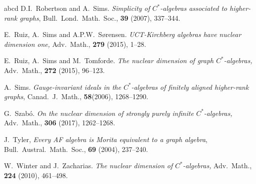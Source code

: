 \documentclass[12pt]{amsart}
\theoremstyle{plain}
\theoremstyle{definition}
\theoremstyle{remark}
\begin{document}
\begin{thebibliography}{abcd}
 D.I.\ Robertson and A.\ Sims.
\emph{Simplicity of {$C^\ast$}-algebras associated to higher-rank graphs}, Bull.\ Lond.\ Math.\ Soc., \textbf{39} (2007),
337--344.

 E.\ Ruiz, A.\ Sims and A.P.W.\ S\o rensen. \emph{UCT-Kirchberg algebras have nuclear dimension one,} Adv.\ Math., \textbf{279} (2015), 1--28.

 E.\ Ruiz, A.\ Sims and M.\ Tomforde. \emph{The nuclear dimension of graph $C^*$-algebras,} Adv.\ Math., \textbf{272} (2015), 96--123.

 A.\ Sims. \emph{Gauge-invariant ideals in the {$C^*$}-algebras of finitely
aligned higher-rank graphs}, Canad.\ J.\ Math., \textbf{58}(2006), 1268--1290.

 G.\ Szab\'o. \emph{On the nuclear dimension of strongly purely infinite $C^*$-algebras,} Adv.\ Math., \textbf{306} (2017), 1262--1268.

 J.\ Tyler, 
\emph{Every AF algebra is Morita equivalent to a graph algebra}, Bull.\ Austral.\ Math.\ Soc., \textbf{69} (2004), 237--240.

 W.\ Winter and J.\ Zacharias. \emph{The nuclear dimension of $C^*$-algebras,} Adv.\ Math., \textbf{224} (2010), 461--498.

\end{thebibliography}
\end{document}
